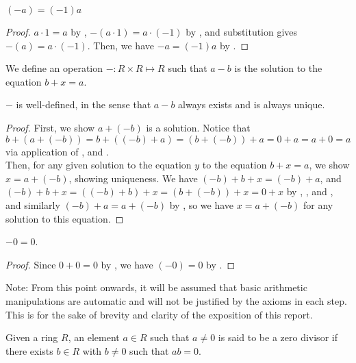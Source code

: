 \begin{theorem}\label{factor-neg-1}
$(-a) = (-1)a$
\end{theorem}
\begin{proof}
$a \cdot 1 = a$ by , $-(a \cdot 1) = a \cdot (-1)$ by , and substitution gives $-(a) = a \cdot (-1)$. Then, we have $-a = (-1)a$ by .
\end{proof}

\begin{definition}[Subtraction]
We define an operation $-: R \times R \mapsto R$ such that $a-b$ is the solution to the equation $b+x = a$.
\end{definition}

\begin{theorem}\label{sub-well-def}
$-$ is well-defined, in the sense that $a-b$ always exists and is always unique. 
\end{theorem}
\begin{proof}
First, we show $a+(-b)$ is a solution. Notice that $b + (a+(-b)) = b + ((-b) + a) = (b + (-b)) + a = 0 + a = a + 0 = a$ via application of ,  and . \\

Then, for any given solution to the equation $y$ to the equation $b+x = a$, we show $x = a+(-b)$, showing uniqueness. We have $(-b) + b+x = (-b) + a$, and $(-b) + b + x = ((-b)+b) + x = (b+(-b)) + x = 0 + x$ by , , and , and similarly $(-b) + a = a + (-b)$ by , so we have $x = a + (-b)$ for any solution to this equation.
\end{proof}

\begin{lemma}[Inverse of $0$ is $0$]\label{0-inverse-0}
    $-0 = 0$.
\end{lemma}
\begin{proof}
    Since $0+0 = 0$ by , we have $(-0) = 0$ by .
\end{proof}

Note: From this point onwards, it will be assumed that basic arithmetic manipulations are automatic and will not be justified by the axioms in each step. This is for the sake of brevity and clarity of the exposition of this report.

\begin{definition}\label{zero-divisor}
    Given a ring $R$, an element $a \in R$ such that $a \neq 0$ is said to be a zero divisor if there exists $b \in R$ with $b \neq 0$ such that $ab = 0$.
\end{definition}

